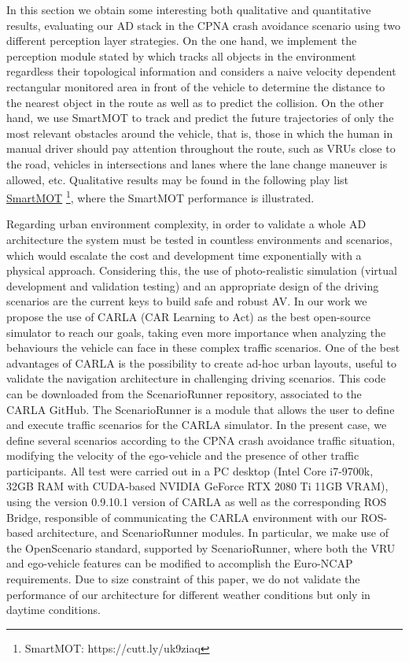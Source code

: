 In this section we obtain some interesting both qualitative and quantitative results, evaluating our AD stack \cite{gomez2021train} in the CPNA crash avoidance scenario using two different perception layer strategies. On the one hand, we implement the perception module stated by \cite{gomez2020real} which tracks all objects in the environment regardless their topological information and considers a naive velocity dependent rectangular monitored area in front of the vehicle to determine the distance to the nearest object in the route as well as to predict the collision. On the other hand, we use SmartMOT to track and predict the future trajectories of only the most relevant obstacles around the vehicle, that is, those in which the human in manual driver should pay attention throughout the route, such as VRUs close to the road, vehicles in intersections and lanes where the lane change maneuver is allowed, etc. Qualitative results may be found in the following play list \href{https://cutt.ly/uk9ziaq}{SmartMOT} \footnote{SmartMOT: https://cutt.ly/uk9ziaq}, where the SmartMOT performance is illustrated. 

Regarding urban environment complexity, in order to validate a whole AD architecture the system must be tested in countless environments and scenarios, which would escalate the cost and development time exponentially with a physical approach. Considering this, the use of photo-realistic simulation (virtual development and validation testing) and an appropriate design of the driving scenarios are the current keys to build safe and robust AV. In our work we propose the use of CARLA (CAR Learning to Act) \cite{carla} as the best open-source simulator to reach our goals, taking even more importance when analyzing the behaviours the vehicle can face in these complex traffic scenarios. One of the best advantages of CARLA is the possibility to create ad-hoc urban layouts, useful to validate the navigation architecture in challenging driving scenarios. This code can be downloaded from the ScenarioRunner repository, associated to the CARLA GitHub. The ScenarioRunner is a module that allows the user to define and execute traffic scenarios for the CARLA simulator. In the present case, we define several scenarios according to the CPNA crash avoidance traffic situation, modifying the velocity of the ego-vehicle and the presence of other traffic participants. All test were carried out in a PC desktop (Intel Core i7-9700k, 32GB RAM with CUDA-based NVIDIA GeForce RTX 2080 Ti 11GB VRAM), using the version 0.9.10.1 version of CARLA as well as the corresponding ROS Bridge, responsible of communicating the CARLA environment with our ROS-based architecture, and ScenarioRunner modules. In particular, we make use of the OpenScenario standard, supported by ScenarioRunner, where both the VRU and ego-vehicle features can be modified to accomplish the Euro-NCAP requirements. Due to size constraint of this paper, we do not validate the performance of our architecture for different weather conditions but only in daytime conditions. 

